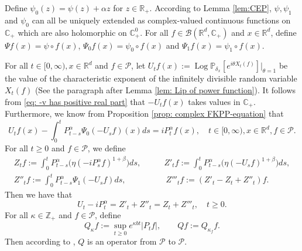 \documentclass[EJP]{ejpecp} %
\begin{document}
	Define $\psi_0(z) = \psi(z) + \alpha z$ for $z\in \mathbb{R}_+$.
	According to Lemma \ref{lem:CEP}, $\psi, \psi_1$ and $\psi_0$ can all be uniquely extended as complex-valued continuous functions on $\mathbb C_+$ which are also holomorphic on $\mathbb C^0_+$.
	For all $f\in \mathcal B(\mathbb R^d, \mathbb C_+)$ and $x\in \mathbb R^d$, define $\Psi f (x) = \psi\circ f(x)$, $\Psi_0 f(x)= \psi_0 \circ f(x)$ and $\Psi_1 f(x)= \psi_1 \circ f(x)$.

	For all $t\in [0,\infty), x\in \mathbb R^d $ and $f \in \mathcal{P}$, let $ U_tf(x) := \operatorname{Log} \mathbb P_{\delta_x}[e^{i\theta X_t(f)}]|_{\theta = 1} $ be the value of the characteristic exponent of the infinitely divisible random variable $X_t(f)$ (See the paragraph after Lemma \ref{lem: Lip of power function}).
	It follows from \eqref{eq: -v has positive real part} that $-U_tf(x)$ takes values in $\mathbb C_+$. Furthermore, we know from Proposition \ref{prop: complex FKPP-equation} that
\begin{equation}
\label{eq:chareq2}
  	U_tf(x) - \int_0^t P^\alpha_{t-s} \Psi_0(-U_sf)(x)ds
  	= i P^{\alpha}_t f(x),
  	\quad t\in [0,\infty), x\in \mathbb{R}^d, f\in \mathcal P.
\end{equation}
	For all $t\geq 0$ and $f\in \mathcal P$, we define
\begin{align}
\label{eq: def of Zf}
  	Z_t f
  	:= \int_0^t P^\alpha_{t-s}\big( \eta (-i P^\alpha_sf)^{1+\beta}\big)ds,
  	& \qquad Z'_t f
    := \int_0^t P^\alpha_{t-s}\big( \eta (-U_s f)^{1+\beta}\big)ds,
  	\\ Z''_t f
  	:= \int_0^t P^\alpha_{t-s}\Psi_1(-U_s f)ds,
  	& \qquad\  Z'''_t f
    := (Z'_t - Z_t+ Z''_t)f.
\end{align}
	Then we have that
\begin{equation}
\label{eq: key equality}
  	U_t - i P^\alpha_t
  	= Z'_t + Z''_t
  	= Z_t + Z'''_t,
  	\quad t\geq 0.
\end{equation}
	For all $\kappa \in \mathbb Z_+$ and $f\in \mathcal P$, define
\begin{equation}
\label{eq:Q}
  	Q_\kappa f
  	:= \sup_{t\geq 0} e^{\kappa b t}|P_t f|,
  	\qquad  Q f
  	:= Q_{\kappa_f}f.
\end{equation}
	Then according to \cite[Fact 1.2]{MarksMilos2018CLT}, $Q$ is an operator from $\mathcal P$ to $\mathcal P$.
\end{document}
